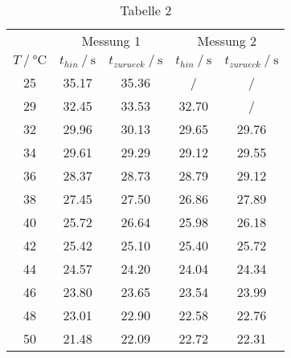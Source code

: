 \begin{table}
    \centering
    \caption{Tabelle 2}
    \begin{tabular}{ccccc}
      \toprule
      & \multicolumn{2}{c}{Messung 1} &\multicolumn{2}{c}{Messung 2} \\
      \cmidrule(lr){2-3} \cmidrule(lr){4-5}
      {$T \mathbin{/} \unit{\celsius}$} &
      {$t_{hin} \mathbin{/} \unit{\second}$} &
      {$t_{zurueck} \mathbin{/} \unit{\second}$} &
      {$t_{hin} \mathbin{/} \unit{\second}$} &
      {$t_{zurueck} \mathbin{/} \unit{\second}$} \\
      \midrule
      25 & 35.17 & 35.36 & /     & /     \\
      29 & 32.45 & 33.53 & 32.70 & /     \\
      32 & 29.96 & 30.13 & 29.65 & 29.76 \\
      34 & 29.61 & 29.29 & 29.12 & 29.55 \\
      36 & 28.37 & 28.73 & 28.79 & 29.12 \\
      38 & 27.45 & 27.50 & 26.86 & 27.89 \\
      40 & 25.72 & 26.64 & 25.98 & 26.18 \\
      42 & 25.42 & 25.10 & 25.40 & 25.72 \\
      44 & 24.57 & 24.20 & 24.04 & 24.34 \\
      46 & 23.80 & 23.65 & 23.54 & 23.99 \\
      48 & 23.01 & 22.90 & 22.58 & 22.76 \\
      50 & 21.48 & 22.09 & 22.72 & 22.31 \\
      \bottomrule
    \end{tabular}
  \end{table}
